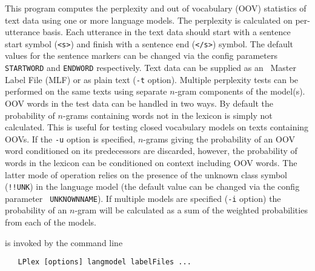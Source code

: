 %
%
%

\newpage
{}


This program computes the perplexity and out of vocabulary (OOV) statistics of
text data using one or more language models. The perplexity is calculated on
per-utterance basis. Each utterance in the text data should start with a
sentence start symbol ({\tt <s>}) and finish with a sentence end ({\tt </s>})
symbol. The default values for the sentence markers can be changed via the
config parameters {\tt STARTWORD} and {\tt ENDWORD} respectively. Text data can
be supplied as an \HTK\ Master Label File (MLF) or as plain text ({\tt -t}
option). Multiple perplexity tests can be performed on the same texts using
separate $n$-gram components of the model(s). OOV words in the test data can be
handled in two ways. By default the probability of $n$-grams containing words
not in the lexicon is simply not calculated. This is useful for testing closed
vocabulary models on texts containing OOVs. If the {\tt -u} option is
specified, $n$-grams giving the probability of an OOV word conditioned on its
predecessors are discarded, however, the probability of words in the lexicon
can be conditioned on context including OOV words. The latter mode of operation
relies on the presence of the unknown class symbol ({\tt !!UNK}) in the
language model (the default value can be changed via the config parameter {\tt
UNKNOWNNAME}). If multiple models are specified ({\tt -i} option) the
probability of an $n$-gram will be calculated as a sum of the weighted
probabilities from each of the models.


 is invoked by the command line
\begin{verbatim}
   LPlex [options] langmodel labelFiles ...
\end{verbatim}

